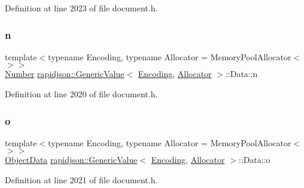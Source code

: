 Definition at line 2023 of file document.\+h.

\mbox{\label{unionrapidjson_1_1_generic_value_1_1_data_a0163c333b902c6dfd1dccc21082f40eb}} 
\subsubsection{\texorpdfstring{n}{n}}
{\footnotesize\ttfamily template$<$typename Encoding, typename Allocator = Memory\+Pool\+Allocator$<$$>$$>$ \\
\mbox{\hyperlink{unionrapidjson_1_1_generic_value_1_1_number}{Number}} \mbox{\hyperlink{classrapidjson_1_1_generic_value}{rapidjson\+::\+Generic\+Value}}$<$ \mbox{\hyperlink{classrapidjson_1_1_encoding}{Encoding}}, \mbox{\hyperlink{classrapidjson_1_1_allocator}{Allocator}} $>$\+::Data\+::n}



Definition at line 2020 of file document.\+h.

\mbox{\label{unionrapidjson_1_1_generic_value_1_1_data_acfe05f4d8b4c4ecef9c27137cdf9ed42}} 
\subsubsection{\texorpdfstring{o}{o}}
{\footnotesize\ttfamily template$<$typename Encoding, typename Allocator = Memory\+Pool\+Allocator$<$$>$$>$ \\
\mbox{\hyperlink{structrapidjson_1_1_generic_value_1_1_object_data}{Object\+Data}} \mbox{\hyperlink{classrapidjson_1_1_generic_value}{rapidjson\+::\+Generic\+Value}}$<$ \mbox{\hyperlink{classrapidjson_1_1_encoding}{Encoding}}, \mbox{\hyperlink{classrapidjson_1_1_allocator}{Allocator}} $>$\+::Data\+::o}



Definition at line 2021 of file document.\+h.

